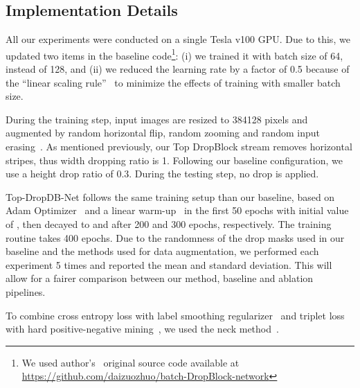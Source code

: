 \documentclass[a4paper,conference]{IEEEtran}
\begin{document}
\subsection{Implementation Details}
 
All our experiments were conducted on a single Tesla v100 GPU. Due to this, we updated two items in the baseline code\footnote{We used author's~\cite{dai2019batch} original source code available at \url{https://github.com/daizuozhuo/batch-DropBlock-network}}: (i) we trained it with batch size of 64, instead of 128, and (ii) we reduced the learning rate by a factor of 0.5 because of the ``linear scaling rule''~\cite{goyal2017accurate} to minimize the effects of training with smaller batch size.
 
During the training step, input images are resized to 384128 pixels and augmented by random horizontal flip, random zooming and random input erasing~\cite{ghiasi2018DropBlock}. As mentioned previously, our Top DropBlock stream removes horizontal stripes, thus width dropping ratio is 1. Following our baseline configuration, we use a height drop ratio of 0.3. During the testing step, no drop is applied.
 
Top-DropDB-Net follows the same training setup than our baseline, based on Adam Optimizer~\cite{kingma2014adam} and a linear warm-up~\cite{goyal2017accurate} in the first 50 epochs with initial value of , then decayed to  and  after 200 and 300 epochs, respectively. The training routine takes 400 epochs. Due to the randomness of the drop masks used in our baseline and the methods used for data augmentation, we performed each experiment 5 times and reported the mean and standard deviation. This will allow for a fairer comparison between our method, baseline and ablation pipelines.

To combine cross entropy loss with label smoothing regularizer~\cite{szegedy2016rethinking} and triplet loss with hard positive-negative mining~\cite{hermans2017defense}, we used the neck method~\cite{luo2019bag}.
 
\end{document}
